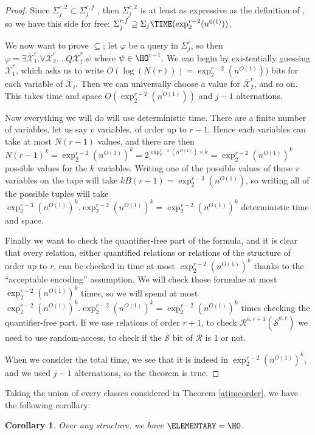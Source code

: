 \documentclass[a4paper,12pt]{article}
\newtheorem{corollary}[theorem]{Corollary}
\theoremstyle{definition}
\newcommand{\ATIME}[2]{\ensuremath{\Sigma_{#2}\TIME(#1)}}
\renewcommand{\phi}{\varphi}
\newcommand{\hoa}[1]{\ensuremath{\HO^{#1}}}
\newcommand{\hob}[2]{\ensuremath{\Sigma^{#1}_{#2}}}
\newcommand{\hoc}[3]{\ensuremath{\Sigma^{#1,#3}_{#2}}}
\newcommand{\mc}{\mathcal}
\newcommand{\olmc}[1]{\overline{\mathcal{#1}}}
\begin{document}
\begin{proof}
  Since $\hoc rj2\subset\hoc rjf$ , then \hoc rj2 is at least as
  expressive as the definition of \cite{lauri}, so we have this side for
  free: $\hoc{r}{j}{f}\supseteq\ATIME{\exp_2^{r-2}(n^{0(1)})}{j}$.

  We now want to prove $\subseteq$; let $\phi$ be a query in
  $\hob{r}{j}$, so then $\phi=\exists \olmc X^{r}_{1}.\forall\olmc
  X^{r}_{2}.\dots Q\olmc X^{r}_{j}.\psi$ where $\psi\in\hoa{r-1}$. We
  can begin by existentially guessing $\olmc X_{1}^{r}$, which asks us
  to write $O(\log(N(r)))=\exp_2^{r-2}(n^{O(1)}))$ bits for each
  variable of $\olmc X_{i}$. Then we can universally choose a value
  for $\olmc X^{r}_{2}$, and so on. This takes time and space
  $O(\exp_2^{r-2}(n^{O(1)}))$ and $j-1$ alternations. 

    Now everything we will do will use
  deterministic time. There are a finite number of variables, let us
  say $v$ variables, of order up to $r-1$. Hence each variables can
  take at most $N(r-1)$ values, and there are then
  $N(r-1)^{k}=\exp_{2}^{r-2}(n^{O(1)})^{k}=2^{\exp_{2}^{r-3}(n^{O(1)})\times
    k}=\exp_{2}^{r-2}(n^{O(1)})^{k}$ possible values for the $k$
  variables. Writing one of the possible values of those $v$ variables
  on the tape will take $kB(r-1)=\exp_{2}^{r-3}(n^{O(1)})$, so writing
  all of the possible tuples will take
  $\exp_{2}^{r-3}(n^{O(1)})^{k}.\exp_{2}^{r-2}(n^{O(1)})^{k}=\exp_{2}^{r-2}(n^{O(1)})^{k}$
  deterministic time and space.

  Finally we want to check the quantifier-free part of the formula,
  and it is clear that every relation, either quantified relations or
  relations of the structure of order up to $r$, can be checked in
  time at most $\exp_{2}^{r-2}(n^{O(1)})^{k}$ thanks to the
  ``acceptable encoding'' assumption. We will check those formulae at
  most $\exp_{2}^{r-2}(n^{O(1)})^{k}$ times, so we will spend at most
  $\exp_{2}^{r-2}(n^{O(1)})^{k}.\exp_{2}^{r-2}(n^{O(1)})^{k}=\exp_{2}^{r-2}(n^{O(1)})^{k}$
  times checking the quantifier-free part. If we use relations of
  order $r+1$, to check $\mc R^{a,r+1}(\olmc S^{a,r})$ we need to use
  random-access, to check if the $\olmc S$ bit of $\mc R$ is 1 or not.

  When we consider the total time, we see that it is indeed in
  $\exp_{2}^{r-2}(n^{O(1)})^{k}$, and we used $j-1$ alternations, so
  the theorem is true.
\end{proof}
Taking the union of every classes considered in Theorem
\ref{atimeorder}, we have the following corollary:
\begin{corollary}
  Over any structure, we have $\ELEMENTARY=\HO$.
\end{corollary}
\end{document}
